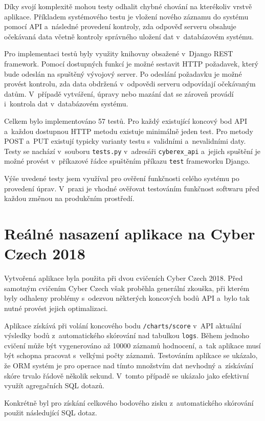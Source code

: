 \documentclass[
  digital,
  twoside,
  table, 
  nolof, 
  nolot
]{fithesis3}
\begin{document}
Díky svojí komplexitě mohou testy odhalit chybné chování na kterékoliv vrstvě aplikace. Příkladem systémového testu je vložení nového záznamu do systému pomocí API a~následné provedení kontroly, zda odpověď serveru obsahuje očekávaná data včetně kontroly správného uložení dat v~databázovém systému.

Pro implementaci testů byly využity knihovny obsažené v~Django REST framework. Pomocí dostupných funkcí je možné sestavit HTTP požadavek, který bude odeslán na spuštěný vývojový server. Po odeslání požadavku je možné provést kontrolu, zda data obdržená v~odpovědi serveru odpovídají očekávaným datům. V~případě vytváření, úpravy nebo mazání dat se zároveň provádí i~kontrola dat v~databázovém systému. 

Celkem bylo implementováno 57 testů. Pro každý existující koncový bod API a~každou dostupnou HTTP metodu existuje minimálně jeden test. Pro metody POST a~PUT existují typicky varianty testu s~validními a~nevalidními daty. Testy se nachází v~souboru \texttt{tests.py} v~adresáři \texttt{cyberex\_api} a~jejich spuštění je možné provést v~příkazové řádce spuštěním příkazu \texttt{test} frameworku Django.

Výše uvedené testy jsem využíval pro ověření funkčnosti celého systému po provedení úprav. V~praxi je vhodné ověřovat testováním funkčnost softwaru před každou změnou na produkčním prostředí.

\section{Reálné nasazení aplikace na Cyber Czech 2018}

Vytvořená aplikace byla použita při dvou cvičeních Cyber Czech 2018. Před samotným cvičením Cyber Czech však proběhla generální zkouška, při kterém byly odhaleny problémy s~odezvou některých koncových bodů API a~bylo tak nutné provést jejich optimalizaci.

Aplikace získává při volání koncového bodu \texttt{/charts/score} v~API aktuální výsledky bodů z~automatického skórování nad tabulkou \texttt{logs}. Během jednoho cvičení může být vygenerováno až 10000 záznamů hodnocení, a~tak aplikace musí být schopna pracovat s~velkými počty záznamů. Testováním aplikace se ukázalo, že ORM systém je pro operace nad tímto množstvím dat nevhodný a~získávání skóre trvalo řádově několik sekund. V~tomto případě se ukázalo jako efektivní využít agregačních SQL dotazů. 

Konkrétně byl pro získání celkového bodového zisku z~automatického skórování použit následující SQL dotaz.
\end{document}
